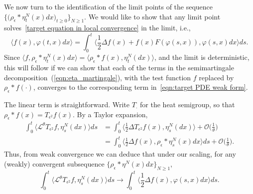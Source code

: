 \documentclass[EJP]{ejpecp} %
\begin{document}
We now turn to the identification of the limit points of the sequence 
$\big\{\big(\rho_\epsilon*\eta_t^N(x)dx\big)_{t\geq 0}\big\}_{N\geq 1}$.
We would like to show that any limit point solves~\eqref{target equation in local convergence}
in the limit, i.e.,
\begin{equation}\label{eqn:target PDE weak form}
    \langle f(x), \varphi(t,x)dx \rangle
    =
    \int_0^t
        \Big\langle
        \frac{1}{2}\Delta f(x) + f(x) F(\varphi(s,x))
        ,
        \varphi(s,x) dx
        \Big\rangle
    ds .
\end{equation}
Since 
$\langle f, \rho_\epsilon*\eta_t^N(x)dx\rangle=
\langle \rho_\epsilon*f(x), \eta_t^N(dx)\rangle$,
and the limit is deterministic,
this will follow if we can show that each of the terms in the semimartingale
decomposition~(\ref{eqn:eta_martingale}),
with the test function $f$ replaced by $\rho_\epsilon*f(\cdot)$,
converges to the corresponding term in~\eqref{eqn:target PDE weak form}.

The linear term is straightforward.
Write $T_{\cdot}$ for the heat semigroup, so that
$\rho_\epsilon*f(x) = T_{\epsilon^2}f(x)$.
By a Taylor expansion,
\begin{align*}
\int_0^t \big\langle \mathcal{L}^\theta T_{\epsilon^2} f, 
	\eta_s^N(dx)\big\rangle ds 
&= \int_0^t \big\langle \frac{1}{2} \Delta T_{\epsilon^2} f(x), 
	\eta_s^N(dx) \big\rangle 
	+ \mathcal{O}\Big(\frac{1}{\theta}\Big) 
\\ &= \int_0^t \big\langle \frac{1}{2} \Delta f(x), \rho_\epsilon* \eta_s^N(x) dx 
	\big\rangle ds + \mathcal{O}\Big(\frac{1}{\theta}\Big).
\end{align*}
Thus, from weak convergence we can deduce that under our scaling,
for any (weakly) convergent subsequence $\{\rho_\epsilon*\eta^N(x)dx\}_{N\geq 1}$,
\[ 
\int_0^t \big\langle \mathcal{L}^\theta T_{\epsilon^2} f, 
\eta_s^N(dx)\big\rangle ds 
\rightarrow \int_0^t \big\langle \frac{1}{2} \Delta f(x), 
\varphi (s,x) dx \big\rangle ds. 
\]
\end{document}
